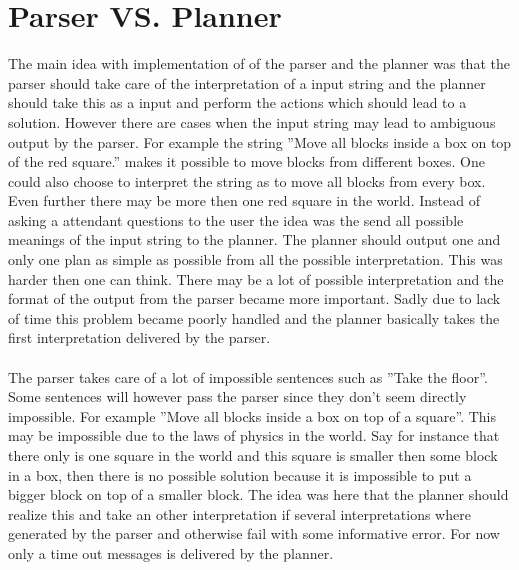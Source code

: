 \section{Parser VS. Planner}
The main idea with implementation of of the parser and the planner was that the
parser should take care of the interpretation of a input string and the planner
should take this as a input and perform the actions which should lead to a
solution. However there are cases when the input string may lead to
ambiguous output by the parser. For example the string ''Move all blocks inside a box on top
of the red square.'' makes it possible to move blocks from different boxes. One could
also choose to interpret the string as to move all blocks from every box. Even
further there may be more then one red square in the world. Instead of asking a
attendant questions to the user the idea was the send all possible meanings of
the input string to the planner. The planner should output one and only one plan as simple as
possible from all the possible interpretation. This was harder then one can
think. There may be a lot of possible interpretation and the format of the
output from the parser became more important. Sadly due to lack of time this
problem became poorly handled and the planner basically takes the first
interpretation delivered by the parser. 
\\\\
The parser takes care of a lot of impossible sentences such as ''Take the
floor''. Some sentences will however pass the parser since they don't seem
directly impossible. For example ''Move all blocks inside a box on top of a
square''. This may be impossible due to the laws of physics in the world. Say
for instance that there only is one square in the world and this square is
smaller then some block in a box, then there is no possible solution because it
is impossible to put a bigger block on top of a smaller block. The idea
was here that the planner should realize this and take an other interpretation if
several interpretations where generated by the parser and otherwise fail with
some informative error. For now only a time out messages is  delivered by the
planner.           



